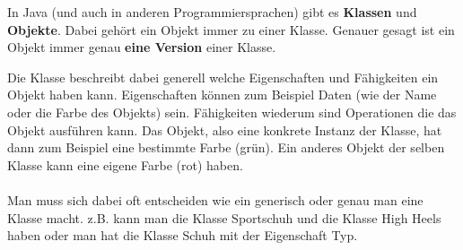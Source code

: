 


\begin{Infobox}
 In Java (und auch in anderen Programmiersprachen) gibt es \textbf{Klassen} und \textbf{Objekte}.
 Dabei gehört ein Objekt immer zu einer Klasse. Genauer gesagt ist ein Objekt immer genau \textbf{eine Version} einer Klasse.
 
 Die Klasse beschreibt dabei generell welche Eigenschaften und Fähigkeiten ein Objekt haben kann.
 Eigenschaften können zum Beispiel Daten (wie der Name oder die Farbe des Objekts) sein.
 Fähigkeiten wiederum sind Operationen die das Objekt ausführen kann.
 Das Objekt, also eine konkrete Instanz der Klasse, hat dann zum Beispiel eine bestimmte Farbe (grün).
 Ein anderes Objekt der selben Klasse kann eine eigene Farbe (rot) haben.
 \paragraph{}
 Man muss sich dabei oft entscheiden wie ein generisch oder genau man eine Klasse macht. z.B. kann man die Klasse Sportschuh und die Klasse High Heels haben oder man hat die Klasse Schuh mit der Eigenschaft Typ.
\end{Infobox}
